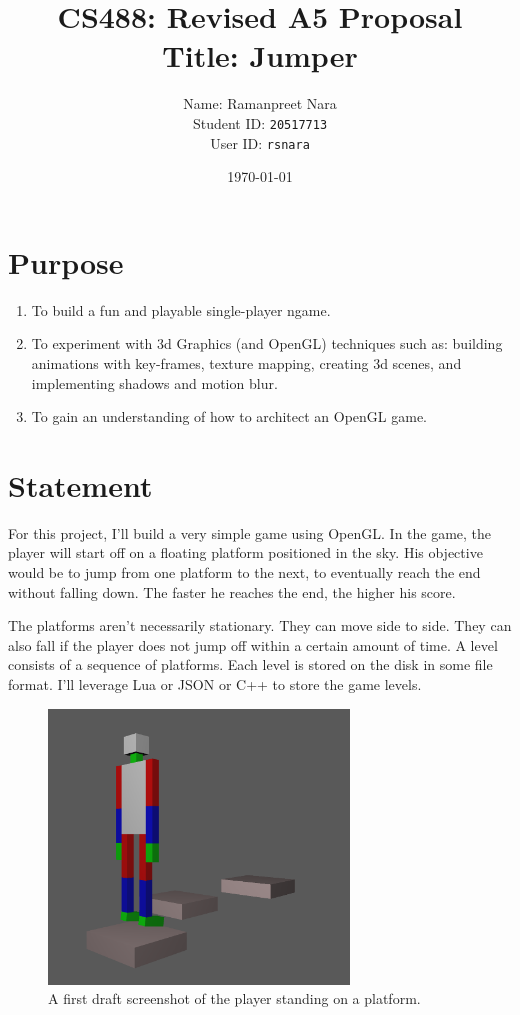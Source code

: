 \documentclass[11pt]{article}
\title{CS488: Revised A5 Proposal \\ \small{Title:  Jumper}}
\date{\today}
\author{Name: Ramanpreet Nara \\ Student ID: \texttt{20517713} \\ User ID: \texttt{rsnara}}
\begin{document}
\maketitle
\newpage
\section{Purpose}
\begin{enumerate}
\item To build a fun and playable single-player ngame.
\item To experiment with 3d Graphics (and OpenGL) techniques such as: building animations with key-frames, texture mapping, creating 3d scenes, and implementing shadows and motion blur.
\item To gain an understanding of how to architect an OpenGL game.
\end{enumerate}
\section{Statement}
For this project, I'll build a very simple game using OpenGL. In the game, the player will start off on a floating platform positioned in the sky. His objective would be to jump from one platform to the next, to eventually reach the end without falling down. The faster he reaches the end, the higher his score.

The platforms aren't necessarily stationary. They can move side to side. They can also fall if the player does not jump off within a certain amount of time. A level consists of a sequence of platforms. Each level is stored on the disk in some file format. I'll leverage Lua or JSON or C++ to store the game levels. 

\begin{figure}[H]
\includegraphics[width=8cm]{screenshot}
\centering
\caption{A first draft screenshot of the player standing on a platform.}
\end{figure}
\end{document}

